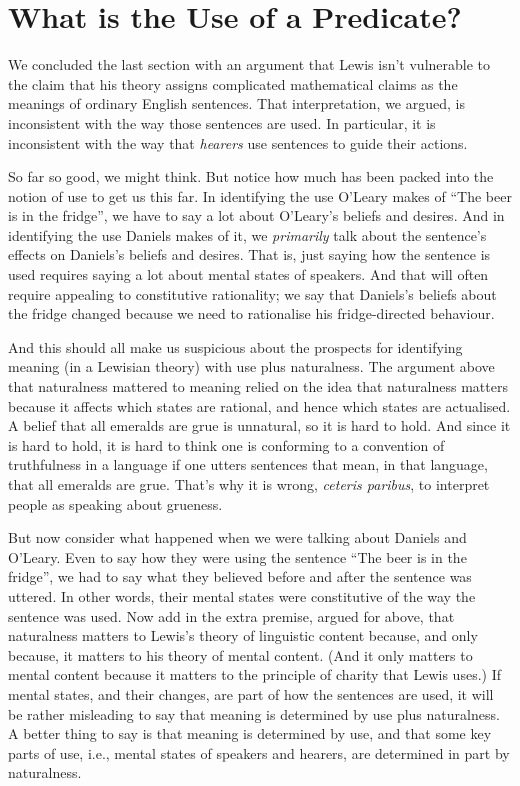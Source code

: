 \documentclass[
  11pt,
  letterpaper,
  DIV=11,
  numbers=noendperiod,
  twoside]{scrartcl}
\begin{document}
\section{What is the Use of a
Predicate?}\label{what-is-the-use-of-a-predicate}

We concluded the last section with an argument that Lewis isn't
vulnerable to the claim that his theory assigns complicated mathematical
claims as the meanings of ordinary English sentences. That
interpretation, we argued, is inconsistent with the way those sentences
are used. In particular, it is inconsistent with the way that
\emph{hearers} use sentences to guide their actions.

So far so good, we might think. But notice how much has been packed into
the notion of use to get us this far. In identifying the use O'Leary
makes of ``The beer is in the fridge'', we have to say a lot about
O'Leary's beliefs and desires. And in identifying the use Daniels makes
of it, we \emph{primarily} talk about the sentence's effects on
Daniels's beliefs and desires. That is, just saying how the sentence is
used requires saying a lot about mental states of speakers. And that
will often require appealing to constitutive rationality; we say that
Daniels's beliefs about the fridge changed because we need to
rationalise his fridge-directed behaviour.

And this should all make us suspicious about the prospects for
identifying meaning (in a Lewisian theory) with use plus naturalness.
The argument above that naturalness mattered to meaning relied on the
idea that naturalness matters because it affects which states are
rational, and hence which states are actualised. A belief that all
emeralds are grue is unnatural, so it is hard to hold. And since it is
hard to hold, it is hard to think one is conforming to a convention of
truthfulness in a language if one utters sentences that mean, in that
language, that all emeralds are grue. That's why it is wrong,
\emph{ceteris paribus}, to interpret people as speaking about grueness.

But now consider what happened when we were talking about Daniels and
O'Leary. Even to say how they were using the sentence ``The beer is in
the fridge'', we had to say what they believed before and after the
sentence was uttered. In other words, their mental states were
constitutive of the way the sentence was used. Now add in the extra
premise, argued for above, that naturalness matters to Lewis's theory of
linguistic content because, and only because, it matters to his theory
of mental content. (And it only matters to mental content because it
matters to the principle of charity that Lewis uses.) If mental states,
and their changes, are part of how the sentences are used, it will be
rather misleading to say that meaning is determined by use plus
naturalness. A better thing to say is that meaning is determined by use,
and that some key parts of use, i.e., mental states of speakers and
hearers, are determined in part by naturalness.
\end{document}
